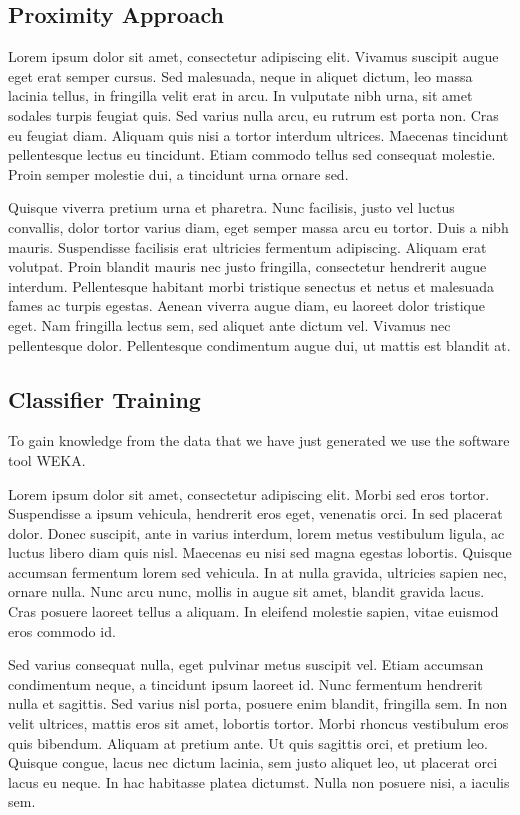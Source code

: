 \documentclass[final,5p,times,twocolumn]{elsarticle}
\begin{document}
\subsection{Proximity Approach}
\label{process:proximity}

Lorem ipsum dolor sit amet, consectetur adipiscing elit. Vivamus suscipit augue
eget erat semper cursus. Sed malesuada, neque in aliquet dictum, leo massa
lacinia tellus, in fringilla velit erat in arcu. In vulputate nibh urna, sit
amet sodales turpis feugiat quis. Sed varius nulla arcu, eu rutrum est porta
non. Cras eu feugiat diam. Aliquam quis nisi a tortor interdum ultrices.
Maecenas tincidunt pellentesque lectus eu tincidunt. Etiam commodo tellus sed
consequat molestie. Proin semper molestie dui, a tincidunt urna ornare sed.

Quisque viverra pretium urna et pharetra. Nunc facilisis, justo vel luctus
convallis, dolor tortor varius diam, eget semper massa arcu eu tortor. Duis a
nibh mauris. Suspendisse facilisis erat ultricies fermentum adipiscing. Aliquam
erat volutpat. Proin blandit mauris nec justo fringilla, consectetur hendrerit
augue interdum. Pellentesque habitant morbi tristique senectus et netus et
malesuada fames ac turpis egestas. Aenean viverra augue diam, eu laoreet dolor
tristique eget. Nam fringilla lectus sem, sed aliquet ante dictum vel. Vivamus
nec pellentesque dolor. Pellentesque condimentum augue dui, ut mattis est
blandit at.

\subsection{Classifier Training}
\label{process:training}

To gain knowledge from the data that we have just generated we use the software tool WEKA\cite{Hall2009}.

Lorem ipsum dolor sit amet, consectetur adipiscing elit. Morbi sed eros tortor.
Suspendisse a ipsum vehicula, hendrerit eros eget, venenatis orci. In sed
placerat dolor. Donec suscipit, ante in varius interdum, lorem metus vestibulum
ligula, ac luctus libero diam quis nisl. Maecenas eu nisi sed magna egestas
lobortis. Quisque accumsan fermentum lorem sed vehicula. In at nulla gravida,
ultricies sapien nec, ornare nulla. Nunc arcu nunc, mollis in augue sit amet,
blandit gravida lacus. Cras posuere laoreet tellus a aliquam. In eleifend
molestie sapien, vitae euismod eros commodo id.

Sed varius consequat nulla, eget pulvinar metus suscipit vel. Etiam accumsan
condimentum neque, a tincidunt ipsum laoreet id. Nunc fermentum hendrerit nulla
et sagittis. Sed varius nisl porta, posuere enim blandit, fringilla sem. In non
velit ultrices, mattis eros sit amet, lobortis tortor. Morbi rhoncus vestibulum
eros quis bibendum. Aliquam at pretium ante. Ut quis sagittis orci, et pretium
leo. Quisque congue, lacus nec dictum lacinia, sem justo aliquet leo, ut
placerat orci lacus eu neque. In hac habitasse platea dictumst. Nulla non
posuere nisi, a iaculis sem.
\end{document}

